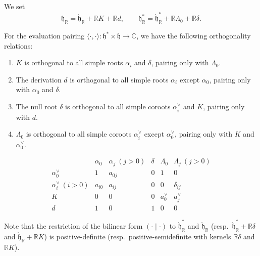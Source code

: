 \documentclass[12pt]{article}
\begin{document}
We set
\[
    \mathfrak{h}_{\mathbb{R}} = \mathring{\mathfrak{h}}_{\mathbb{R}} + \mathbb{R}K + \mathbb{R}d,
    \qquad
    \mathfrak{h}_{\mathbb{R}}^* = \mathring{\mathfrak{h}}_{\mathbb{R}}^* + \mathbb{R}\Lambda_0 + \mathbb{R}\delta.
\]
\begin{remark}
    For the evaluation pairing $\langle \cdot, \cdot \rangle : \mathfrak{h}^* \times \mathfrak{h} \to \mathbb{C}$, we have the following orthogonality relations:
    \begin{enumerate}
        \item $K$ is orthogonal to all simple roots $\alpha_i$ and $\delta$, pairing only with $\Lambda_0$.
        \item The derivation $d$ is orthogonal to all simple roots $\alpha_i$ except $\alpha_0$, pairing only with $\alpha_0$ and $\delta$.
        \item The null root $\delta$ is orthogonal to all simple coroots $\alpha_i^\vee$ and $K$, pairing only with $d$.
        \item $\Lambda_0$ is orthogonal to all simple coroots $\alpha_i^\vee$ except $\alpha_0^\vee$, pairing only with $K$ and $\alpha_0^\vee$.
    \end{enumerate}
    \[
        \begin{array}{c|c|c|c|c|c}
                                  & \alpha_0 & \alpha_j \ (j>0) & \delta & \Lambda_0 & \Lambda_j \ (j>0) \\ \hline
            \alpha_0^\vee         & 1        & a_{0j}           & 0      & 1         & 0                 \\
            \alpha_i^\vee \ (i>0) & a_{i0}   & a_{ij}           & 0      & 0         & \delta_{ij}       \\
            K                     & 0        & 0                & 0      & a_0^\vee  & a_j^\vee          \\
            d                     & 1        & 0                & 1      & 0         & 0
        \end{array}
    \]
\end{remark}
Note that the restriction of the bilinear form $(\cdot \mid \cdot)$ to
$\mathring{\mathfrak{h}}_{\mathbb{R}}^*$ and $\mathring{\mathfrak{h}}_{\mathbb{R}}$
(resp.\ $\mathring{\mathfrak{h}}_{\mathbb{R}}^* + \mathbb{R}\delta$ and
$\mathring{\mathfrak{h}}_{\mathbb{R}} + \mathbb{R}K$)
is positive-definite (resp.\ positive-semidefinite with kernels $\mathbb{R}\delta$ and $\mathbb{R}K$).
\end{document}
